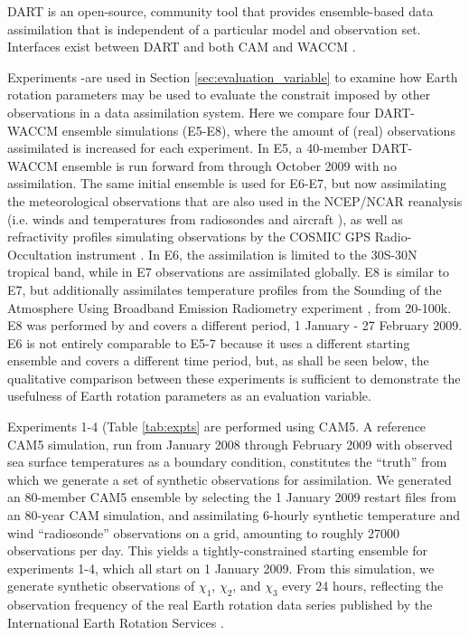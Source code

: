 DART \citep{Anderson2009} is an open-source, community tool that provides ensemble-based data assimilation that is independent of a particular model and observation set.
Interfaces exist between DART and both CAM \citep{Raeder2012} and WACCM \citep{Pedatella2013}.

Experiments \WACCMNODA-\NCARFULL are used in Section \ref{sec:evaluation_variable} to examine how Earth rotation parameters may be used to evaluate the constrait imposed by other observations in a data assimilation system.  
Here we compare four DART-WACCM ensemble simulations (E5-E8), where the amount of (real) observations assimilated is increased for each experiment. 
In E5, a 40-member DART-WACCM ensemble is run forward from through October 2009 with no assimilation.  
The same initial ensemble is used for E6-E7, but now assimilating the meteorological observations that are also used in the NCEP/NCAR reanalysis (i.e. winds and temperatures from radiosondes and aircraft \citep{Saha2010}), as well as refractivity profiles simulating observations by the COSMIC GPS Radio-Occultation instrument \citep{Anthes2008}.
In E6, the assimilation is limited to the 30S-30N tropical band, while in E7 observations are assimilated globally. 
E8 is similar to E7, but additionally assimilates temperature profiles from the Sounding of the Atmosphere Using Broadband Emission Radiometry experiment \citep[SABER]{Russell2009}, from 20-100k.
E8 was performed by \citet{Pedatella2014} and covers a different period, 1 January - 27 February 2009.  
E6 is not entirely comparable to E5-7 because it uses a different starting ensemble and covers a different time period, but, as shall be seen below, the qualitative comparison between these experiments is sufficient to demonstrate the usefulness of Earth rotation parameters as an evaluation variable. 

Experiments 1-4 (Table \ref{tab:expts} are performed using CAM5.  
A reference CAM5 simulation, run from January 2008 through February 2009 with observed sea surface temperatures as a boundary condition, constitutes the ``truth'' from which we generate a set of synthetic observations for assimilation. 
We generated an 80-member CAM5 ensemble by selecting the 1 January 2009 restart files from an 80-year CAM simulation, and assimilating 6-hourly synthetic temperature and wind ``radiosonde'' observations on a grid, amounting to roughly 27000 observations per day. 
This yields a tightly-constrained starting ensemble for experiments 1-4, which all start on 1 January 2009.
From this simulation, we generate synthetic observations of $\chi_1$, $\chi_2$, and $\chi_3$ every 24 hours, reflecting the observation frequency of the real Earth rotation data series published by the International Earth Rotation Services \citep{iers}.  

